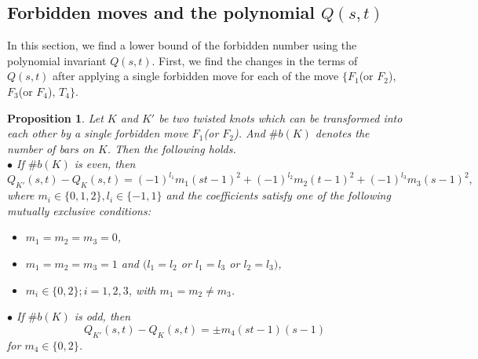 \documentclass[10pt,a4paper,reqno]{amsart}
\newtheorem{proposition}[theorem]{Proposition}
\theoremstyle{definition}
\theoremstyle{remark}
\begin{document}
	\subsection{Forbidden moves and the polynomial $Q(s,t)$}
	In this section, we find a lower bound of the forbidden number using  the polynomial invariant $Q(s,t)$. First, we find the changes in the terms of $Q(s,t)$ after applying a single forbidden move for each of the move $\{F_1$(or $F_2$), $F_3$(or $F_4$), $T_4\}$. 
	\begin{proposition}\label{pr:for1}
		Let $K$ and $K'$ be two twisted knots which can be transformed into each
		other by a single forbidden move $F_1$(or $F_2$). And $\# b(K)$ denotes the number of bars on $K$. Then the following holds.\\
		 $\bullet$ If $\# b(K)$ is even, then
				$$Q_{K'}(s,t)-Q_{K}(s,t)
			=(-1)^{l_{1}} m_{1}(st-1)^{2}+(-1)^{l_{2}} m_{2}(t-1)^{2}+(-1)^{l_{3}}m_{3}(s-1)^{2},
			$$
			where $m_i \in \{0,1,2\}, l_{i}\in \{-1,1\}$ 
			and the coefficients satisfy one of the following mutually exclusive conditions:
			\begin{itemize}
				\item[(i)] $m_1=m_2=m_3=0$,
				\item[(ii)] $m_1=m_2=m_3=1$ and 
				 $(l_1=l_2$ or $l_1=l_3$ or $l_2=l_3)$,
				\item[(iii)] $m_i\in\{0,2\}; i=1,2,3$, with $m_1= m_2 \neq m_3$.
			\end{itemize}
		 $\bullet$ If $\# b(K)$ is odd, then
			$$Q_{K'}(s,t)-Q_{K}(s,t)=
			\pm m_{4}(st-1)(s-1)	$$
			for $m_{4}\in \{0,2\}$.
	\end{proposition}
\end{document}
